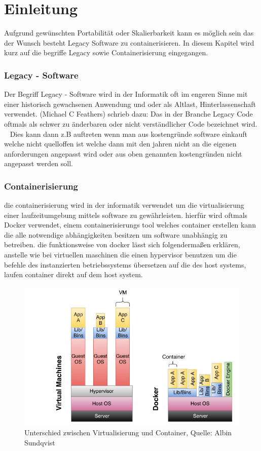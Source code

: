 

\section{Einleitung}

Aufgrund gewünschten Portabilität oder Skalierbarkeit kann es möglich sein das der Wunsch besteht Legacy Software zu containerisieren. In diesem Kapitel wird kurz auf die begriffe Legacy sowie Containerisierung eingegangen.

\subsubsection{Legacy - Software}
Der Begriff Legacy - Software wird in der Informatik oft im engeren Sinne mit einer historisch gewachsenen Anwendung und oder als Altlast, Hinterlassenschaft verwendet. (Michael C Feathers) schrieb dazu: Das in der Branche Legacy Code oftmals als schwer zu änderbaren oder nicht verständlicher Code bezeichnet wird. ~\cite{feathers2020effektives}
Dies kann dann z.B auftreten wenn man aus kostengründe software einkauft welche nicht quelloffen ist welche dann mit den jahren nicht an die eigenen anforderungen angepasst wird oder
aus oben genannten kostengründen nicht angepasst werden soll.

\subsubsection{Containerisierung}
die containerisierung wird in der informatik verwendet um die virtualisierung einer laufzeitumgebung mittels software zu gewährleisten. hierfür wird oftmals Docker verwendet, einem containerisierungs tool welches container erstellen kann die alle notwendige abhängigkeiten besitzen um
software unabhängig zu betreiben. die funktionsweise von docker lässt sich folgendermaßen erklären, anstelle wie bei virtuellen maschinen die einen hypervisor benutzen um die befehle des instanzierten betriebssystems übersetzen
auf die des host systems, laufen container direkt auf dem host system.

\begin{figure}[h]
	\includegraphics[width=\columnwidth]{gfx/vm vs container.png} %
	\caption{Unterschied zwischen Virtualisierung und Container, Quelle: Albin Sundqvist \cite{sundqvist2020guidelines}}
\end{figure}

